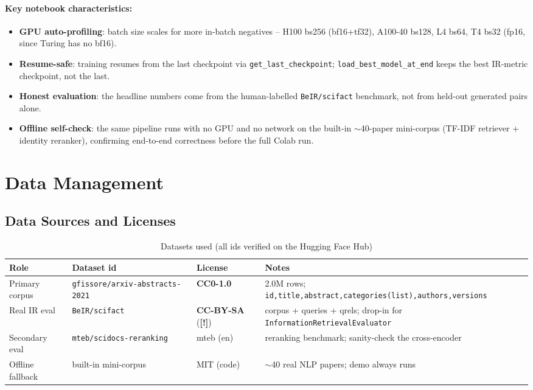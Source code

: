 \documentclass[12pt,a4paper]{article}
\newcommand{\flag}{\textbf{[\textcolor{red!70!black}{!}]}}
\begin{document}
\paragraph{Key notebook characteristics:}
\begin{itemize}\setlength\itemsep{0.15em}
  \item \textbf{GPU auto-profiling}: batch size scales for more in-batch negatives -- H100 bs256 (bf16+tf32), A100-40 bs128, L4 bs64, T4 bs32 (fp16, since Turing has no bf16).
  \item \textbf{Resume-safe}: training resumes from the last checkpoint via \texttt{get\_last\_checkpoint}; \texttt{load\_best\_model\_at\_end} keeps the best IR-metric checkpoint, not the last.
  \item \textbf{Honest evaluation}: the headline numbers come from the human-labelled \texttt{BeIR/scifact} benchmark, not from held-out generated pairs alone.
  \item \textbf{Offline self-check}: the same pipeline runs with no GPU and no network on the built-in $\sim$40-paper mini-corpus (TF-IDF retriever + identity reranker), confirming end-to-end correctness before the full Colab run.
\end{itemize}

\section{Data Management}

\subsection{Data Sources and Licenses}

\begin{table}[H]
\centering
\caption{Datasets used (all ids verified on the Hugging Face Hub)}
\small
\begin{tabularx}{\linewidth}{@{} l l l L @{}}
\toprule
\textbf{Role} & \textbf{Dataset id} & \textbf{License} & \textbf{Notes} \\
\midrule
Primary corpus & \texttt{gfissore/arxiv-abstracts-2021} & \textbf{CC0-1.0} & 2.0M rows; \texttt{id,title,abstract,categories(list),authors,versions} \\
Real IR eval & \texttt{BeIR/scifact} & \textbf{CC-BY-SA} (\flag) & corpus + queries + qrels; drop-in for \texttt{InformationRetrievalEvaluator} \\
Secondary eval & \texttt{mteb/scidocs-reranking} & mteb (en) & reranking benchmark; sanity-check the cross-encoder \\
Offline fallback & built-in mini-corpus & MIT (code) & $\sim$40 real NLP papers; demo always runs \\
\bottomrule
\end{tabularx}
\end{table}
\end{document}

